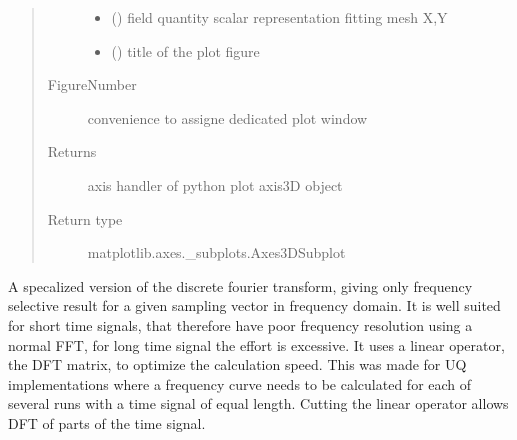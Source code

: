 \documentclass[letterpaper,10pt,english]{sphinxmanual}
\begin{document}
\begin{fulllineitems}
\begin{fulllineitems}
\begin{quote}
\begin{description}
\begin{itemize}
\item {} 
 (\sphinxstyleliteralemphasis{\sphinxupquote{ (}}\sphinxstyleliteralemphasis{\sphinxupquote{)}}) \textendash{} field quantity scalar representation fitting mesh X,Y

\item {} 
 () \textendash{} title of the plot figure

\end{itemize}

\item[{FigureNumber}] \leavevmode
convenience to assigne dedicated plot window

\item[{Returns}] \leavevmode
axis handler of python plot axis3D object

\item[{Return type}] \leavevmode
matplotlib.axes.\_subplots.Axes3DSubplot

\end{description}\end{quote}

\end{fulllineitems}


\begin{fulllineitems}
\label{\detokenize{FIT:FIT.FIT.selectiveDFT}}
A specalized version of the discrete fourier transform, giving only frequency selective result for a given sampling vector in frequency domain. It is well suited for short time signals, that therefore have poor frequency resolution using a normal FFT, for long time signal the effort is excessive. It uses a linear operator, the DFT matrix, to optimize the calculation speed. This was made for UQ implementations where a frequency curve needs to be calculated for each of several runs with a time signal of equal length. Cutting the linear operator allows DFT of parts of the time signal.


\end{fulllineitems}
\end{fulllineitems}
\end{document}
